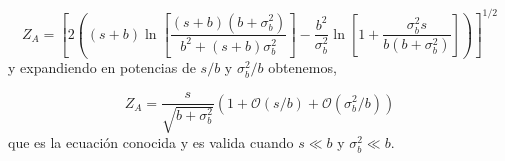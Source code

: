 \begin{equation}
  Z_A = \left[ 2 \left( (s+b) \ln \left[
      \frac{(s+b)(b+\sigma_b^2)}{b^2+(s+b)\sigma_b^2} \right] -
    \frac{b^2}{\sigma_b^2} \ln \left[ 1 + \frac{\sigma_b^2 s}{b(b+\sigma_b^2)}
      \right] \right) \right]^{1/2}
  \label{eq:Za}
\end{equation}
%
y expandiendo en potencias de $s/b$ y $\sigma_b^2/b$ obtenemos,

\begin{equation}
  Z_A = \frac{s}{\sqrt{b+\sigma_b^2}} \left( 1 + \mathcal{O}(s/b) + \mathcal{O}(\sigma_b^2/b) \right)
\end{equation}
%
que es la ecuación conocida y es valida cuando $s\ll b$ y $\sigma_b^2 \ll b$.











